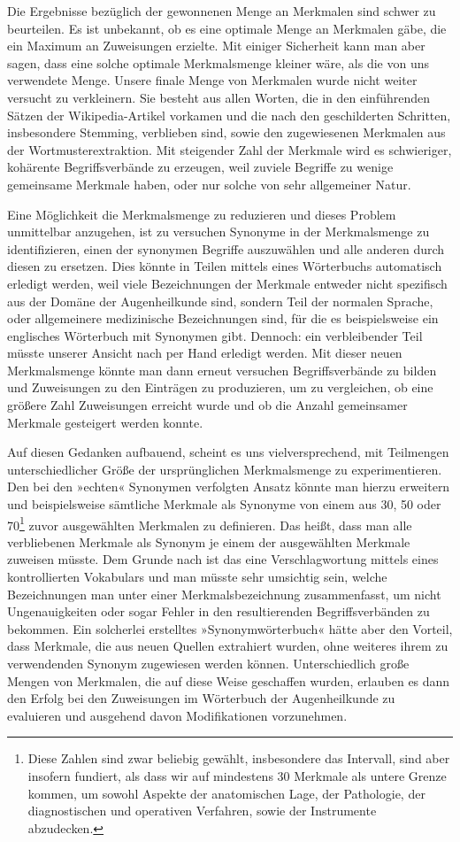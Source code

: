 \documentclass[pagesize,DIV=calc,12pt,draft]{scrreprt}
\begin{document}
Die Ergebnisse bezüglich der gewonnenen Menge an Merkmalen sind schwer zu beurteilen.
Es ist unbekannt, ob es eine optimale Menge an Merkmalen gäbe, die ein Maximum an Zuweisungen erzielte.
Mit einiger Sicherheit kann man aber sagen, dass eine solche optimale Merkmalsmenge kleiner wäre, als die von uns verwendete Menge.
Unsere finale Menge von Merkmalen wurde nicht weiter versucht zu verkleinern.
Sie besteht aus allen Worten, die in den einführenden Sätzen der Wikipedia-Artikel vorkamen und die nach den geschilderten Schritten, insbesondere Stemming, verblieben sind, sowie den zugewiesenen Merkmalen aus der Wortmusterextraktion.
Mit steigender Zahl der Merkmale wird es schwieriger, kohärente Begriffsverbände zu erzeugen, weil zuviele Begriffe zu wenige gemeinsame Merkmale haben, oder nur solche von sehr allgemeiner Natur.

Eine Möglichkeit die Merkmalsmenge zu reduzieren und dieses Problem unmittelbar anzugehen, ist zu versuchen Synonyme in der Merkmalsmenge zu identifizieren, einen der synonymen Begriffe auszuwählen und alle anderen durch diesen zu ersetzen.
Dies könnte in Teilen mittels eines Wörterbuchs automatisch erledigt werden, weil viele Bezeichnungen der Merkmale entweder nicht spezifisch aus der Domäne der Augenheilkunde sind, sondern Teil der normalen Sprache, oder allgemeinere medizinische Bezeichnungen sind, für die es beispielsweise ein englisches Wörterbuch mit Synonymen gibt.
Dennoch: ein verbleibender Teil müsste unserer Ansicht nach per Hand erledigt werden.
Mit dieser neuen Merkmalsmenge könnte man dann erneut versuchen Begriffsverbände zu bilden und Zuweisungen zu den Einträgen zu produzieren, um zu vergleichen, ob eine größere Zahl Zuweisungen erreicht wurde und ob die Anzahl gemeinsamer Merkmale gesteigert werden konnte.

Auf diesen Gedanken aufbauend, scheint es uns vielversprechend, mit Teilmengen unterschiedlicher Größe der ursprünglichen Merkmalsmenge zu experimentieren.
Den bei den »echten« Synonymen verfolgten Ansatz könnte man hierzu erweitern und beispielsweise sämtliche Merkmale als Synonyme von einem aus 30, 50 oder 70\footnote{Diese Zahlen sind zwar beliebig gewählt, insbesondere das Intervall, sind aber insofern fundiert, als dass wir auf mindestens 30 Merkmale als untere Grenze kommen, um sowohl Aspekte der anatomischen Lage, der Pathologie, der diagnostischen und operativen Verfahren, sowie der Instrumente abzudecken.} zuvor ausgewählten Merkmalen zu definieren.
Das heißt, dass man alle verbliebenen Merkmale als Synonym je einem der ausgewählten Merkmale zuweisen müsste.
Dem Grunde nach ist das eine Verschlagwortung mittels eines kontrollierten Vokabulars und man müsste sehr umsichtig sein, welche Bezeichnungen man unter einer Merkmalsbezeichnung zusammenfasst, um nicht Ungenauigkeiten oder sogar Fehler in den resultierenden Begriffsverbänden zu bekommen.
Ein solcherlei erstelltes »Synonymwörterbuch« hätte aber den Vorteil, dass Merkmale, die aus neuen Quellen extrahiert wurden, ohne weiteres ihrem zu verwendenden Synonym zugewiesen werden können.
Unterschiedlich große Mengen von Merkmalen, die auf diese Weise geschaffen wurden, erlauben es dann den Erfolg bei den Zuweisungen im Wörterbuch der Augenheilkunde zu evaluieren und ausgehend davon Modifikationen vorzunehmen.
\end{document}
